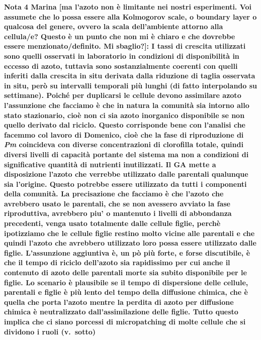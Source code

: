 \documentclass[a4paper,oneside]{article}
\begin{document}
    {\color{red}\textbf{Nota 4 Marina
    {\color{blue}[ma l'azoto non {\`e} limitante nei nostri esperimenti. Voi assumete che lo possa essere alla Kolmogorov scale, o boundary layer o qualcosa del genere, ovvero la scala dell'ambiente attorno alla cellula/e? Questo {\`e} un punto che non mi {\`e} chiaro e che dovrebbe essere menzionato/definito. Mi sbaglio?]}:
    I tassi di crescita utilizzati sono quelli osservati in laboratorio in condizioni di disponibilit{\`a} in eccesso di azoto, tuttavia sono sostanzialmente coerenti con quelli inferiti dalla crescita in situ derivata dalla riduzione di taglia osservata in situ, per{\`o} su intervalli temporali pi{\`u} lunghi (di fatto interpolando su settimane). Poich{\'e} per duplicarsi le cellule devono assimilare azoto l'assunzione che facciamo {\`e} che in natura la comunit{\`a} sia intorno allo stato stazionario, cio{\`e} non ci sia azoto inorganico disponibile se non quello derivato dal riciclo. Questo corrisponde bene con l'analisi che facemmo col lavoro di Domenico, cio{\`e} che la fase di riproduzione di \textit{Pm} coincideva con diverse concentrazioni di clorofilla totale, quindi diversi livelli di capacit{\`a} portante del sistema ma non a condizioni di significative quantit{\`a} di nutrienti inutilizzati. Il GA mette a disposizione l'azoto che verrebbe utilizzato dalle parentali qualunque sia l'origine. Questo potrebbe essere utilizzato da tutti i componenti della comunit{\`a}. La precisazione che facciamo {\`e} che l'azoto che avrebbero usato le parentali, che se non avessero avviato la fase riproduttiva, avrebbero piu' o mantenuto i livelli di abbondanza precedenti, venga usato totalmente dalle cellule figlie, perch{\`e} ipotizziamo che le cellule figlie restino molto vicine alle parentali e che quindi l'azoto che avrebbero utilizzato loro possa essere utilizzato dalle figlie. L'assunzione aggiuntiva {\`e}, un p{\`o} pi{\`u} forte, e forse discutibile, {\`e} che il tempo di riciclo dell'azoto sia rapidissimo per cui anche il contenuto di azoto delle parentali morte sia subito disponibile per le figlie. Lo scenario {\`e} plausibile se il tempo di dispersione delle cellule, parentali e figlie {\`e} pi{\`u} lento del tempo della diffusione chimica, che {\`e} quella che porta l'azoto mentre la perdita di azoto per diffusione chimica {\`e} neutralizzato dall'assimilazione delle figlie. Tutto questo implica che ci siano porcessi di micropatching di molte cellule che si dividono i ruoli (v.\ sotto)}
    }
\end{document}
